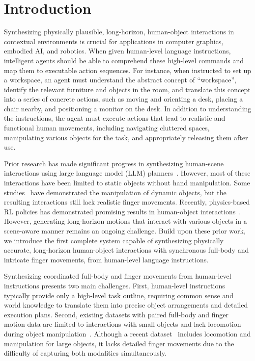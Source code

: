 \section{Introduction}
\label{sec:introduction}

Synthesizing physically plausible, long-horizon, human-object interactions in contextual environments is crucial for applications in computer graphics, embodied AI, and robotics. When given human-level language instructions, intelligent agents should be able to comprehend these high-level commands and map them to executable action sequences. For instance, when instructed to set up a workspace, an agent must understand the abstract concept of ``workspace'', identify the relevant furniture and objects in the room, and translate this concept into a series of concrete actions, such as moving and orienting a desk, placing a chair nearby, and positioning a monitor on the desk. In addition to understanding the instructions, the agent must execute actions that lead to realistic and functional human movements, including navigating cluttered spaces, manipulating various objects for the task, and appropriately releasing them after use.

Prior research has made significant progress in synthesizing human-scene interactions using large language model (LLM) planners~\cite{xiao2024unified}. However, most of these interactions have been limited to static objects without hand manipulation. Some studies~\cite{li2023controllable} have demonstrated the manipulation of dynamic objects, but the resulting interactions still lack realistic finger movements. Recently, physics-based RL policies has demonstrated promising results in human-object interactions~\cite{luo2024grasping, wang2023physhoi}. However, generating long-horizon motions that interact with various objects in a scene-aware manner remains an ongoing challenge. Build upon these prior work, we introduce the first complete system capable of synthesizing physically accurate, long-horizon human-object interactions with synchronous full-body and intricate finger movements, from human-level language instructions. 



Synthesizing coordinated full-body and finger movements from human-level instructions presents two main challenges. First, human-level instructions typically provide only a high-level task outline, requiring common sense and world knowledge to translate them into precise object arrangements and detailed execution plans. Second, existing datasets with paired full-body and finger motion data are limited to interactions with small objects and lack locomotion during object manipulation~\cite{GRAB:2020, fan2023arctic}.
Although a recent dataset~\cite{li2023object} includes locomotion and manipulation for large objects, it lacks detailed finger movements due to the difficulty of capturing both modalities simultaneously. 

